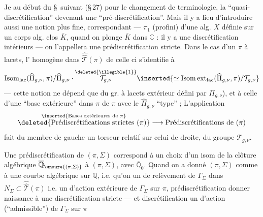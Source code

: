 Je  au début du \S\ suivant (\S\,27) pour le
changement de terminologie, la ``quasi-discrétification''
devenant une ``pré-discrétification''. Mais il y a lieu
d'introduire aussi une notion plus fine, correspondant
---   $\pi_1$ (profini) d'une  alg.
$X$ définie sur un corps alg. clos $\overline K$, quand on plonge
$\overline K$ dans $\mathbb C$ : il y a une discrétification 
 intérieurs --- on l'appellera une
prédiscrétification stricte. Dans le cas d'un
$\pi$ à lacets, l' homogène  dans $\widehat{\widehat{\mathcal T}}(\pi)$ de
celle ci s'identifie à
\[
\operatorname{Isom}_{\mathrm{lac}}(\widehat{\Pi}_{g,\nu},\pi)/\widehat{\Pi}_{g,\nu}\cdot
\overset{\deleted{\illegible{1}}}{\mathcal T_{g,\nu}}
\inserted{\simeq\operatorname{Isom\,ext}_{\mathrm{lac}}(\widehat{\Pi}_{g,\nu},\pi)/\mathcal T_{g,\nu}}
\]
--- cette notion  ne dépend que du gr.  à lacets
extérieur défini par $\Pi_{g,\nu}$), et  
à celle d'une ``base extérieure'' dans $\pi$
de $\pi$ avec le $\widehat{\Pi}_{g,\nu}$ ``type'' ;
L'application
\[
\overset{\inserted{\text{Bases extérieures de }\pi}}{\deleted{\text{Prédiscrétifications strictes }(\pi)}}
\longrightarrow \text{Prédiscrétifications de }(\pi)
\]
fait  du membre de gauche un torseur relatif
 sur celui de droite, du groupe $\mathcal T_{g,\nu}$.

Une prédiscrétification de $(\pi,\Sigma)$ correspond à un
choix d'un isom de la clôture algébrique $\overline{\mathbb Q}_{\unsure{(\pi,\Sigma)}}$  
à $(\pi,\Sigma)$, avec $\overline{\mathbb Q}_0$. Quand on a donné $(\pi,\Sigma)$ comme
 à une courbe algébrique sur $\overline{\mathbb Q}$, i.e. qu'on
 un  de relèvement de $\Gamma_\Sigma$ dans $N_\Sigma\subset\widehat{\widehat{\mathcal T}}(\pi)$
i.e. un  d'action extérieure de $\Gamma_\Sigma$ sur $\pi$, 
prédiscrétification  donner naissance à une discrétification
stricte --- et   discrétification  
un  d'action (``admissible'') de $\Gamma_\Sigma$ sur $\pi$ \unsure{\ldots}

